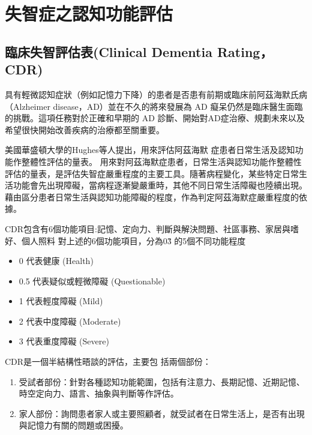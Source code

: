 
\chapter{失智症之認知功能評估}
\label{chapter:intro}

\section{臨床失智評估表(Clinical Dementia Rating，CDR)}

具有輕微認知症狀（例如記憶力下降）的患者是否患有前期或臨床前阿茲海默氏病（Alzheimer disease，AD）並在不久的將來發展為 AD 癡呆仍然是臨床醫生面臨的挑戰。這項任務對於正確和早期的 AD 診斷、開始對AD症治療、規劃未來以及希望很快開始改善疾病的治療都至關重要。

美國華盛頓大學的Hughes等人提出，用來評估阿茲海默 症患者日常生活及認知功能作整體性評估的量表。
用來對阿茲海默症患者，日常生活與認知功能作整體性評估的量表，是評估失智症嚴重程度的主要工具。隨著病程變化，某些特定日常生活功能會先出現障礙，當病程逐漸變嚴重時，其他不同日常生活障礙也陸續出現。藉由區分患者日常生活與認知功能障礙的程度，作為判定阿茲海默症嚴重程度的依據。


CDR包含有6個功能項目:記憶、定向力、判斷與解決問題、社區事務、家居與嗜好、個人照料
對上述的6個功能項目，分為0\~3 的5個不同功能程度

\begin{itemize}
    \item
    0 代表健康 (Health)
    \item
    0.5 代表疑似或輕微障礙 (Questionable)
    \item
    1 代表輕度障礙 (Mild)
    \item
    2 代表中度障礙 (Moderate)
    \item
    3 代表重度障礙 (Severe)
\end{itemize}

\clearpage
CDR是一個半結構性晤談的評估，主要包
括兩個部份：
\begin{enumerate}
	\item
受試者部份：針對各種認知功能範圍，包括有注意力、長期記憶、近期記憶、時空定向力、語言、抽象與判斷等作評估。
\item
家人部份：詢問患者家人或主要照顧者，就受試者在日常生活上，是否有出現與記憶力有關的問題或困擾。
\end{enumerate}

